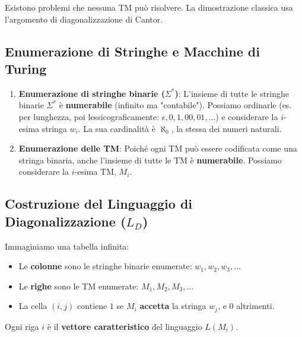\documentclass[a4paper]{article}
\theoremstyle{remark} %
\begin{document}
Esistono problemi che nessuna TM può risolvere. La dimostrazione classica usa l'argomento di diagonalizzazione di Cantor.

\subsection{Enumerazione di Stringhe e Macchine di Turing}

\begin{enumerate}
    \item \textbf{Enumerazione di stringhe binarie ($\Sigma^*$)}: L'insieme di tutte le stringhe binarie $\Sigma^*$ è \textbf{numerabile} (infinito ma "contabile"). Possiamo ordinarle (es. per lunghezza, poi lessicograficamente: $\epsilon, 0, 1, 00, 01, \dots$) e considerare la $i$-esima stringa $w_i$. La sua cardinalità è $\aleph_0$, la stessa dei numeri naturali.
    \item \textbf{Enumerazione delle TM}: Poiché ogni TM può essere codificata come una stringa binaria, anche l'insieme di tutte le TM è \textbf{numerabile}. Possiamo considerare la $i$-esima TM, $M_i$.
\end{enumerate}

\subsection{Costruzione del Linguaggio di Diagonalizzazione ($L_D$)}
Immaginiamo una tabella infinita:
\begin{itemize}
    \item Le \textbf{colonne} sono le stringhe binarie enumerate: $w_1, w_2, w_3, \dots$
    \item Le \textbf{righe} sono le TM enumerate: $M_1, M_2, M_3, \dots$
    \item La cella $(i, j)$ contiene $1$ se $M_i$ \textbf{accetta} la stringa $w_j$, e $0$ altrimenti.
\end{itemize}

Ogni riga $i$ è il \textbf{vettore caratteristico} del linguaggio $L(M_i)$.
\end{document}
